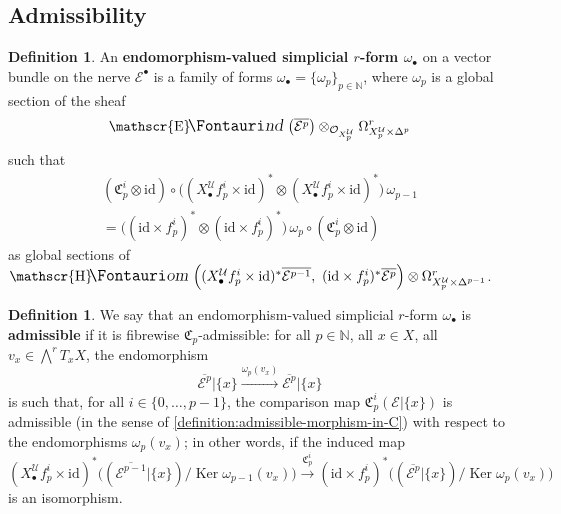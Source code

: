 \documentclass[11pt,fleqn]{article}
\theoremstyle{plain}
\theoremstyle{definition}
\newtheorem{definition}[theorem]{Definition}
\theoremstyle{remark}
\numberwithin{equation}{theorem}
\newcommand{\cover}{\mathcal{U}}
\newcommand{\OO}{\mathcal{O}}
\newcommand{\restricted}{\mathbin{\big\vert}}
\newcommand{\id}{\mathrm{id}}
\newcommand{\define}[1]{\textbf{#1}}
\newcommand{\nerve}[1]{X_{#1}^\cover}
\newcommand{\nervesimplex}[1]{\nerve{#1}\times\Delta^{#1}}
\newcommand{\comparison}[1]{\mathfrak{C}_{#1}}
\DeclareMathOperator{\Ker}{Ker}
\DeclareMathOperator{\sheafhom}{\mathscr{H}\textup{\kern -2.5pt {\large\Fontauri\slshape om}}\,}
\DeclareMathOperator{\sheafend}{\mathscr{E}\textup{\kern -2pt {\large\Fontauri\slshape nd}}\,}
\begin{document}
    \subsection{Admissibility}

        \begin{definition}
            An \define{endomorphism-valued simplicial $r$-form $\omega_\bullet$} on a vector bundle on the nerve $\mathcal{E}^\bullet$ is a family of forms $\omega_\bullet=\{\omega_p\}_{p\in\mathbb{N}}$, where $\omega_p$ is a global section of the sheaf
            \begin{equation*}
                \sheafend\left(\overline{\mathcal{E}^p}\right)\otimes_{\OO_{\nerve{p}}}\Omega_{\nervesimplex{p}}^r
            \end{equation*}
            such that
            \begin{gather*}
                (\comparison{p}^i\otimes\id)
                \circ
                \big( (\nerve{\bullet} f_p^i\times\id)^*\otimes (\nerve{\bullet} f_p^i\times\id)^* \big)
                \,\omega_{p-1}
            \\  = \big( (\id\times f_p^i)^*\otimes(\id\times f_p^i)^* \big)
                \,\omega_p
                \circ
                (\comparison{p}^i\otimes\id)
            \end{gather*}
            as global sections of $\sheafhom\left((\nerve{\bullet} f_p^i\times\id)^*\overline{\mathcal{E}^{p-1}},\,\,(\id\times f_p^i)^*\overline{\mathcal{E}^p}\right)\otimes\Omega_{\nerve{p}\times\Delta^{p-1}}^r$.
        \end{definition}

        \begin{definition}
            We say that an endomorphism-valued simplicial $r$-form $\omega_\bullet$ is \define{admissible} if it is fibrewise $\comparison{p}$-admissible: for all $p\in\mathbb{N}$, all $x\in X$, all $v_x\in\bigwedge^r T_x X$, the endomorphism
            \[
                \overline{\mathcal{E}^p} \restricted \{x\}
                \xrightarrow{\omega_p(v_x)}
                \overline{\mathcal{E}^p} \restricted \{x\}
            \]
            is such that, for all $i\in\{0,\ldots,p-1\}$, the comparison map $\comparison{p}^i(\mathcal{E}\restricted\{x\})$ is admissible (in the sense of \cref{definition:admissible-morphism-in-C}) with respect to the endomorphisms $\omega_p(v_x)$; in other words, if the induced map
            \[
                \left(\nerve{\bullet} f_p^i\times\id\right)^*
                \bigg(
                    \left(\overline{\mathcal{E}^{p-1}}\restricted \{x\}\right)/\Ker\omega_{p-1}(v_x)
                \bigg)
                \xrightarrow{\comparison{p}^i}
                \left(\id\times f_p^i\right)^*
                \bigg(
                    \left(\overline{\mathcal{E}^p}\restricted \{x\}\right)/\Ker\omega_p(v_x)
                \bigg)
            \]
            is an isomorphism.
        \end{definition}
\end{document}
